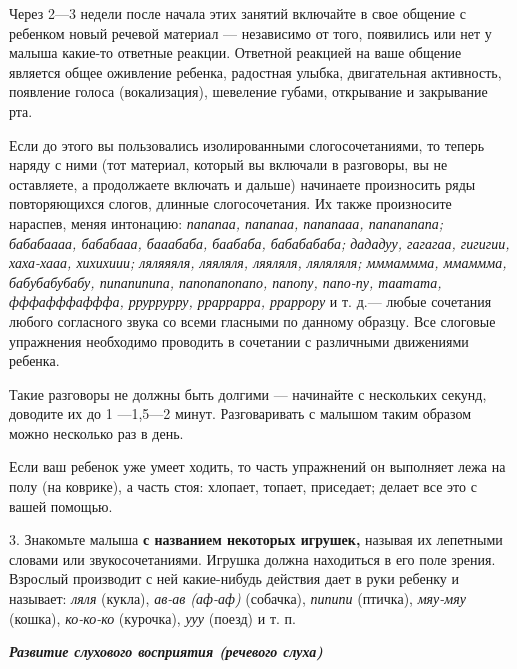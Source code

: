 \documentclass{book}
\renewcommand{\emph}[1]{\textit{#1}}
\begin{document}
Через 2---3 недели после начала этих занятий включайте в свое общение с
ребенком новый речевой материал --- независимо от того, появились или
нет у малыша какие-то ответные реакции. Ответной реакцией на ваше
общение является общее оживление ребенка, радостная улыбка, двигательная
активность, появление голоса (вокализация), шевеление губами, открывание
и закрывание рта.

Если до этого вы пользовались изолированными слогосочетаниями, то теперь
наряду с ними (тот материал, который вы включали в разговоры, вы не
оставляете, а продолжаете включать и дальше) начинаете произносить ряды
повторяющихся слогов, длинные слогосочетания. Их также произносите
нараспев, меняя интонацию: \emph{папапаа, папапаа, папапааа, папапапапа;
бабабаааа, бабабааа, бааабаба, баабаба, бабабабаба; дададуу, гагагаа,
гигигии, хаха-хааа, хихихиии; ляляяяля, ляяляля, ляяляля, ляляляля;
мммаммма, ммаммма, бабубабубабу, пипапипипа, папопапопапо, папопу,
папо-пу, таатата, фффафффафффа, рруррурру, рраррарра, рраррору} и т.
д.--- любые сочетания любого согласного звука со всеми гласными по
данному образцу. Все слоговые упражнения необходимо проводить в
сочетании с различными движениями ребенка.

Такие разговоры не должны быть долгими --- начинайте с нескольких
секунд, доводите их до 1 ---1,5---2 минут. Разговаривать с малышом таким
образом можно несколько раз в день.

Если ваш ребенок уже умеет ходить, то часть упражнений он выполняет лежа
на полу (на коврике), а часть стоя: хлопает, топает, приседает; делает
все это с вашей помощью.

3. Знакомьте малыша \textbf{с названием некоторых игрушек,} называя их
лепетными словами или звукосочетаниями. Игрушка должна находиться в его
поле зрения. Взрослый производит с ней какие-нибудь действия дает в руки
ребенку и называет: \emph{ляля} (кукла), \emph{ав-ав (аф-аф)} (собачка),
\emph{пипипи} (птичка), \emph{мяу-мяу} (кошка), \emph{ко-ко-ко}
(курочка), \emph{ууу} (поезд) и т. п.

\emph{\textbf{Развитие слухового восприятия (речевого слуха)}}
\end{document}
